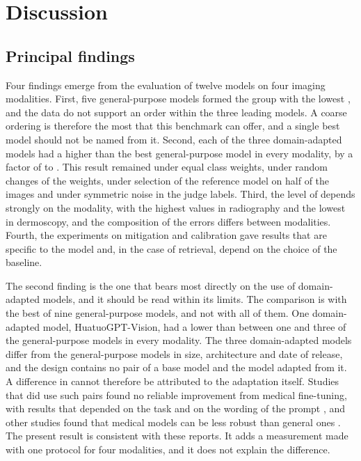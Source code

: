 \section{Discussion}\label{sec:discussion}

\subsection{Principal findings}\label{sec:disc_findings}
Four findings emerge from the evaluation of twelve models on four imaging modalities. First, five general-purpose models formed the group with the lowest \SMHR{}, and the data do not support an order within the three leading models. A coarse ordering is therefore the most that this benchmark can offer, and a single best model should not be named from it. Second, each of the three domain-adapted models had a higher \SMHR{} than the best general-purpose model in every modality, by a factor of  to . This result remained under equal class weights, under random changes of the weights, under selection of the reference model on half of the images and under symmetric noise in the judge labels. Third, the level of \SMHR{} depends strongly on the modality, with the highest values in radiography \rad{} and the lowest in dermoscopy, and the composition of the errors differs between modalities. Fourth, the experiments on mitigation and calibration gave results that are specific to the model and, in the case of retrieval, depend on the choice of the baseline.

The second finding is the one that bears most directly on the use of domain-adapted models, and it should be read within its limits. The comparison is with the best of nine general-purpose models, and not with all of them. One domain-adapted model, HuatuoGPT-Vision, had a lower \SMHR{} than between one and three of the general-purpose models in every modality. The three domain-adapted models differ from the general-purpose models in size, architecture and date of release, and the design contains no pair of a base model and the model adapted from it. A difference in \SMHR{} cannot therefore be attributed to the adaptation itself. Studies that did use such pairs found no reliable improvement from medical fine-tuning, with results that depended on the task and on the wording of the prompt \citep{mclaughlin2026knowledge,sabbaghziarani2026confident}, and other studies found that medical models can be less robust than general ones \citep{wu2024halluvqa,gu2024medvh,xu2025sycophancy}. The present result is consistent with these reports. It adds a measurement made with one protocol for four modalities, and it does not explain the difference.

